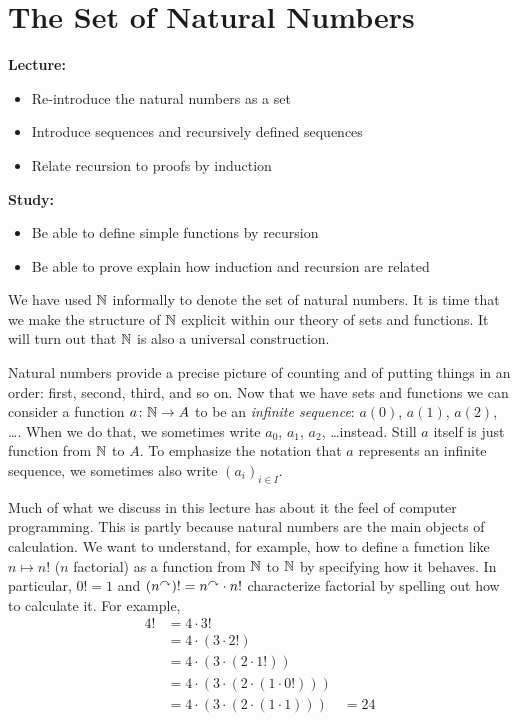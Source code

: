 \chapter{The Set of Natural Numbers}\label{lec:natural-numbers}

\begin{goals}
\noindent\textbf{Lecture:}
\begin{itemize}
	\item Re-introduce the natural numbers as a set
	\item Introduce sequences and recursively defined sequences
	\item Relate recursion to proofs by induction
\end{itemize}

\noindent\textbf{Study:}
\begin{itemize}
	\item Be able to define simple functions by recursion
	\item Be able to prove explain how induction and recursion are related
\end{itemize}
\end{goals}

We have used $\mathbb N$ informally to denote the set of natural numbers. 
It is time that we make the structure of $\mathbb N$ explicit within our theory of sets and functions. 
It will turn out that $\mathbb N$ is also a universal construction. 

Natural numbers provide a precise picture of counting and of putting things in an order: first, second, third, and so on.
Now that we have sets and functions we can consider a function ${a}\colon{\mathbb N}\to{A}$ to be an \emph{infinite sequence}: $a(0)$, $a(1)$, $a(2)$, \ldots.
When we do that, we sometimes write $a_0$, $a_1$, $a_2$, \ldots instead. Still $a$ itself is just function from $\mathbb N$ to $A$. To emphasize the notation that 
$a$ represents an infinite sequence, we sometimes also write $(a_i)_{i\in I}$.

Much of what we discuss in this lecture has about it the feel of computer programming.
This is partly because natural numbers are the main objects of calculation.
We want to understand, for example, how to define a function like $n\mapsto n!$ ($n$ factorial) as a function from $\mathbb N$ to $\mathbb N$ by specifying how it behaves.
In particular, $0! = 1$ and $(n^\curvearrowright)! = n^\curvearrowright\cdot n!$ characterize factorial by spelling out how to calculate it.
For example,
\begin{align*}
	4!  &= 4 \cdot 3! \\
		&= 4 \cdot (3 \cdot 2!)\\
		&= 4 \cdot (3 \cdot (2 \cdot 1!))\\
		&= 4 \cdot (3 \cdot (2 \cdot (1 \cdot 0!)))\\
		&= 4 \cdot (3 \cdot (2 \cdot (1 \cdot 1)))
		&= 24
\end{align*}

